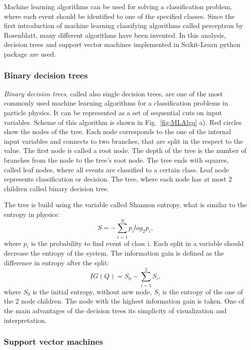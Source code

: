 Machine learning algorithms can be used for solving a classification problem, where each event should be identified to one of the specified classes. Since the first introduction of machine learning classifying algorithms called perceptron by Rosenblatt\cite{VanDerMalsburg1986}, many different algorithms have been invented. In this analysis, decision trees and support vector machines implemented in Scikit-Learn python package\cite{scikit-learn} are used. 

\subsubsection{Binary decision trees}

\textit{Binary decision trees}\cite{cart84-2}, called also single decision trees, are one of the most commonly used machine learning algorithms for a classification problems in particle physics. It can be represented as a set of sequential cuts on input variables. 
Scheme of this algorithm is shown in Fig.~\ref{fig:MLAlgo} a). Red circles show the nodes of the tree. Each node corresponds to the one of the internal input variables and connects to two branches, that are split in the respect to the value. The first node is called a root node. The depth of the tree is the number of branches from the node to the tree's root node. The tree ends with squares, called leaf nodes, where all events are classified to a certain class. Leaf node represents classification or decision. The tree, where each node has at most 2 children called binary decision tree.

The tree is build using the variable called Shannon entropy\cite{ShannonEntropy}, what is similar to the entropy in physics:
\begin{equation}
S=- \sum_{i=1}^{N} p_i log_2 p_i,
\end{equation}
where $p_i$ is the probability to find event of class i. Each split in a variable should decrease the entropy of the system. The information gain is defined as the difference in entropy after the split:
\begin{equation}
IG(Q) = S_0 - \sum_{i=1}^{2}S_i,
\end{equation}
where $S_0$ is the initial entropy, without new node, $S_i$ is the entropy of the one of the 2 node children. The node with the highest information gain is taken. One of the main advantages of the decision trees its simplicity of visualization and interpretation. 

\subsubsection{Support vector machines}

